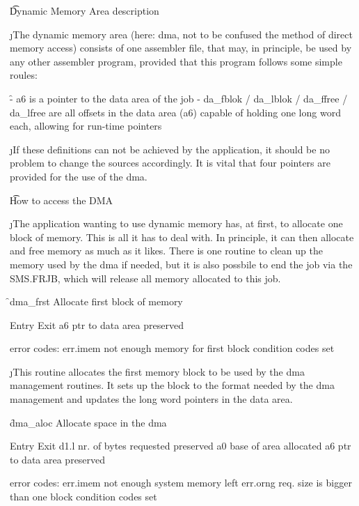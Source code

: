 \t Dynamic Memory Area description

\j The dynamic memory area (here: dma, not to be confused the method
of direct memory access) consists of one assembler file, that may,
in principle, be used by any other assembler program, provided that
this program follows some simple roules:

\f

        - a6 is a pointer to the data area of the job
        - da_fblok / da_lblok / da_ffree / da_lfree are all
          offsets in the data area (a6) capable of holding one
          long word each, allowing for run-time pointers

\j If these definitions can not be achieved by the application,
it should be no problem to change the sources accordingly. It is
vital that four pointers are provided for the use of the dma.


\t How to access the DMA

\j The application wanting to use dynamic memory has, at first,
to allocate one block of memory. This is all it has to deal with.
In principle, it can then allocate and free memory as much as it
likes. There is one routine to clean up the memory used by the
dma if needed, but it is also possbile to end the job via the
SMS.FRJB, which will release all memory allocated to this job.

\f

        \ob dma_frst \pn
        Allocate first block of memory

                Entry                   Exit
        a6      ptr to data area        preserved

        error codes: err.imem   not enough memory for first block
        condition codes set

\j This routine allocates the first memory block to be used by
the dma management routines. It sets up the block to the format
needed by the dma management and updates the long word pointers
in the data area.

\f

        dma_aloc
        Allocate space in the dma

                Entry                   Exit
        d1.l    nr. of bytes requested  preserved
        a0                              base of area allocated
        a6      ptr to data area        preserved

        error codes: err.imem   not enough system memory left
                     err.orng   req. size is bigger than one block
        condition codes set

